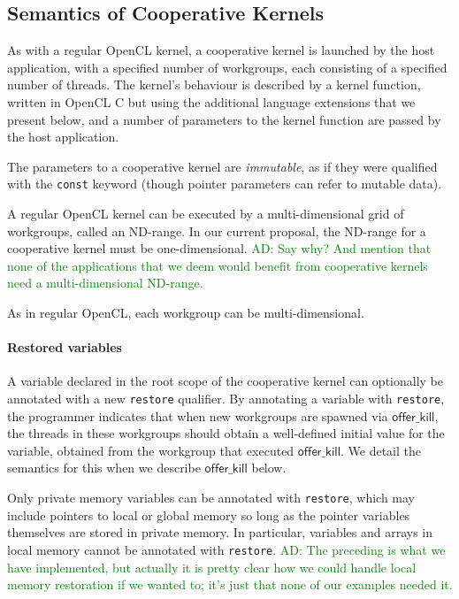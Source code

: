 \documentclass[nocopyrightspace]{sigplanconf-pldi16}
\newcommand{\ADComment}[1]{\textcolor{green}{AD: #1}}
\newcommand{\offerkill}{\mathsf{offer\_kill}}
\begin{document}
\subsection{Semantics of Cooperative Kernels}

As with a regular OpenCL kernel, a cooperative kernel is launched by
the host application, with a specified number of workgroups, each
consisting of a specified number of threads.  The kernel's behaviour
is described by a kernel function, written in OpenCL C but using the
additional language extensions that we present below, and a number of
parameters to the kernel function are passed by the host application.

The parameters to a cooperative kernel are \emph{immutable}, as if
they were qualified with the \texttt{const} keyword (though pointer
parameters can refer to mutable data).

A regular OpenCL kernel can be executed by a multi-dimensional grid of
workgroups, called an ND-range.  In our current proposal, the ND-range
for a cooperative kernel must be one-dimensional.  \ADComment{Say why?
  And mention that none of the applications that we deem would benefit
  from cooperative kernels need a multi-dimensional ND-range.}

As in regular OpenCL, each workgroup can be multi-dimensional.


\paragraph{Restored variables}

A variable declared in the root scope of the cooperative kernel can
optionally be annotated with a new \texttt{restore} qualifier.  By
annotating a variable with \texttt{restore}, the programmer indicates
that when new workgroups are spawned via $\offerkill$, the threads in
these workgroups should obtain a well-defined initial value for the
variable, obtained from the workgroup that executed $\offerkill$.  We
detail the semantics for this when we describe $\offerkill$ below.

Only private memory variables can be annotated with \texttt{restore},
which may include pointers to local or global memory so long as the
pointer variables themselves are stored in private memory.  In
particular, variables and arrays in local memory cannot be annotated
with \texttt{restore}.  \ADComment{The preceding is what we have
  implemented, but actually it is pretty clear how we could handle
  local memory restoration if we wanted to; it's just that none of our
  examples needed it.}
\end{document}
